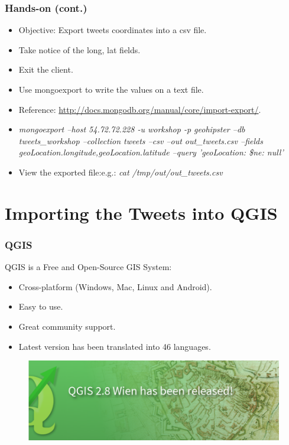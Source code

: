 \documentclass[hyperref={pdfpagelabels=true}]{beamer}
\begin{document}
\begin{frame}
\frametitle{Hands-on (cont.)}
\begin{itemize}
  \item<1->Objective: Export tweets coordinates into a csv file.
  \item<2->Take notice of the long, lat fields.
  \item<2->Exit the client.  
  \item<2->Use mongoexport to write the values on a text file.    
  \item<2->Reference: \url{http://docs.mongodb.org/manual/core/import-export/}.
  \item<3->\textit{ mongoexport --host  54.72.72.228 -u workshop -p geohipster --db tweets\_workshop --collection tweets --csv --out out\_tweets.csv --fields geoLocation.longitude,geoLocation.latitude --query  '{geoLocation: {\$ne: null}}'}
  \item<3->View the exported file:e.g.: \textit{cat /tmp/out/out\_tweets.csv}  
\end{itemize}  
\end{frame}

\section{Importing the Tweets into QGIS} 
\begin{frame}
\frametitle{QGIS}
QGIS is a Free and Open-Source GIS System:
    \begin{itemize}
      \item<2->Cross-platform (Windows, Mac, Linux and Android).
      \item<3->Easy to use.
      \item<4->Great community support.
      \item<5->Latest version has been translated into 46 languages.
      \end{itemize}
      
    \begin{figure}  
      \includegraphics[width=\textwidth]{qgis.png}\\
      \end{figure}  
       
\end{frame}
\end{document}
